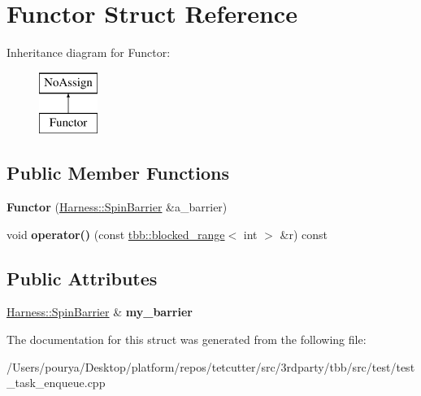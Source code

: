 \hypertarget{structFunctor}{}\section{Functor Struct Reference}
\label{structFunctor}
Inheritance diagram for Functor\+:\begin{figure}[H]
\begin{center}
\leavevmode
\includegraphics[height=2.000000cm]{structFunctor}
\end{center}
\end{figure}
\subsection*{Public Member Functions}
\begin{DoxyCompactItemize}
\item 
\hypertarget{structFunctor_af7fd7a88a9edc4443674df6568b5f8d7}{}{\bfseries Functor} (\hyperlink{classHarness_1_1SpinBarrier}{Harness\+::\+Spin\+Barrier} \&a\+\_\+barrier)\label{structFunctor_af7fd7a88a9edc4443674df6568b5f8d7}

\item 
\hypertarget{structFunctor_a015e647e778db1c59c5c275e1d36f179}{}void {\bfseries operator()} (const \hyperlink{classtbb_1_1blocked__range}{tbb\+::blocked\+\_\+range}$<$ int $>$ \&r) const \label{structFunctor_a015e647e778db1c59c5c275e1d36f179}

\end{DoxyCompactItemize}
\subsection*{Public Attributes}
\begin{DoxyCompactItemize}
\item 
\hypertarget{structFunctor_a57e9e73768a5d46377b5381780487cff}{}\hyperlink{classHarness_1_1SpinBarrier}{Harness\+::\+Spin\+Barrier} \& {\bfseries my\+\_\+barrier}\label{structFunctor_a57e9e73768a5d46377b5381780487cff}

\end{DoxyCompactItemize}


The documentation for this struct was generated from the following file\+:\begin{DoxyCompactItemize}
\item 
/\+Users/pourya/\+Desktop/platform/repos/tetcutter/src/3rdparty/tbb/src/test/test\+\_\+task\+\_\+enqueue.\+cpp\end{DoxyCompactItemize}
